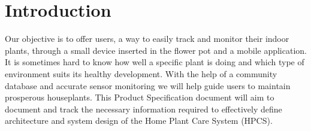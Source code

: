 \section{Introduction}
Our objective is to offer users, a way to easily track and monitor their indoor
plants, through a small device inserted in the flower pot and a mobile application.
It is sometimes hard to know how well a specific plant is doing and which type of
environment suits its healthy development. With the help of a community database
and accurate sensor monitoring we will help guide users to maintain prosperous houseplants.
This Product Specification document will aim to document and track the necessary
information required to effectively define architecture and system design of the
Home Plant Care System (HPCS). 